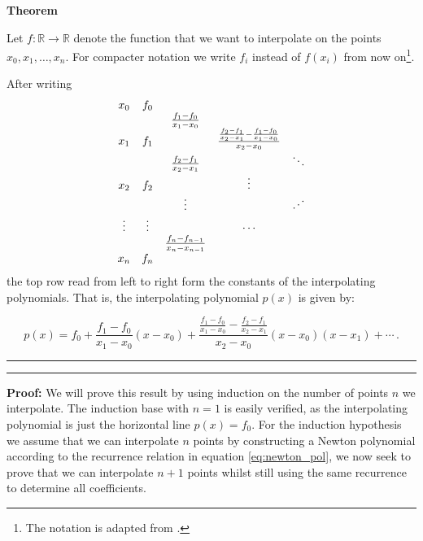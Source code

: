 \begin{tcolorbox}[enhanced, size=fbox, shadow={2mm}{-2mm}{0mm}{gray!30!white}, boxrule={1.5pt}, colback=white, sharp corners, breakable, boxsep=5pt, left=2pt, right=2pt, title=\Large{Newton Polynomials}]
    \label{box:newton_pol}
    \textbf{\Large{Theorem}}

    Let $f: \mathbb R \to \mathbb R$ denote the function that we want to interpolate on the points $x_0, x_1, \dots, x_n$.
    For compacter notation we write $f_i$ instead of $f(x_i)$ from now on\footnote{The notation is adapted from \citeauthor{newton_pol} \cite{newton_pol}.}.

    After writing
    \begin{equation}
        \begin{matrix}
            x_0 & f_0 \\
                & & \frac{f_1-f_0}{x_1-x_0} \\
            x_1 & f_1 & & \frac{\frac{f_2-f_1}{x_2-x_1} - \frac{f_1-f_0}{x_1-x_0}}{x_2-x_0} \\
                & & \frac{f_2-f_1}{x_2-x_1} & & \ddots \\
            x_2 & f_2 & & \vdots\\
                &  & \vdots & & \Rdots \\
            \vdots & \vdots & & \cdots \\
                   &        & \frac{f_n-f_{n-1}}{x_n-x_{n-1}} \\
            x_n & f_n
        \end{matrix} \label{eq:newton_pol}
    \end{equation}
    the top row read from left to right form the constants of the interpolating polynomials.
    That is, the interpolating polynomial $p(x)$ is given by:

    \begin{equation}
        p(x) = f_0 + \frac{f_1-f_0}{x_1-x_0} (x-x_0) + \frac{\frac{f_1-f_0}{x_1-x_0} - \frac{f_2-f_1}{x_2-x_1}}{x_2-x_0} (x-x_0) (x-x_1) + \cdots \,.\label{eq:newton_pol_func}
    \end{equation}

    \vspace{.5em}
    \hrule
    \hrule
    \vspace{.5em}

    \textbf{\Large{Proof:}}
    We will prove this result by using induction on the number of points $n$ we interpolate. The induction base with $n=1$ is easily verified, as the interpolating polynomial is just the horizontal line $p(x)=f_0$. For the induction hypothesis we assume that we can interpolate $n$ points by constructing a Newton polynomial according to the recurrence relation in equation \ref{eq:newton_pol}, we now seek to prove that we can interpolate $n+1$ points whilst still using the same recurrence to determine all coefficients.


\end{tcolorbox}
